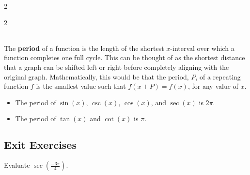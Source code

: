 \begin{multicols}{2}
\begin{center}
		\label{fig:other-pythag-identities}
	\end{center}
\end{multicols}

\vfill

\begin{multicols}{2}
	\begin{myDefinition}~\\[0.5mm]
		The \textbf{period} of a function is the length of the shortest $x$-interval over which a function completes one full cycle. This can be thought of as the shortest distance that a graph can be shifted left or right before completely aligning with the original graph. Mathematically, this would be that the period, $P$, of a repeating function $f$ is the smallest value such that $f(x+P)=f(x)$, for any value of $x$.
		\columnbreak
		\begin{itemize}
			\item The period of $\sin(x)$, $\csc(x)$, $\cos(x)$, and $\sec(x)$ is $2\pi$.
			\item The period of $\tan(x)$ and $\cot(x)$ is $\pi$.
		\end{itemize}
	\end{myDefinition}
\end{multicols}

\vfill

\newpage

\subsection*{Exit Exercises} \label{exit-exercises-section-other-trigonometric-functions}

\begin{myExit}
	Evaluate $\sec\left(\frac{-3\pi}{4}\right)$.
\end{myExit}
\vfill

